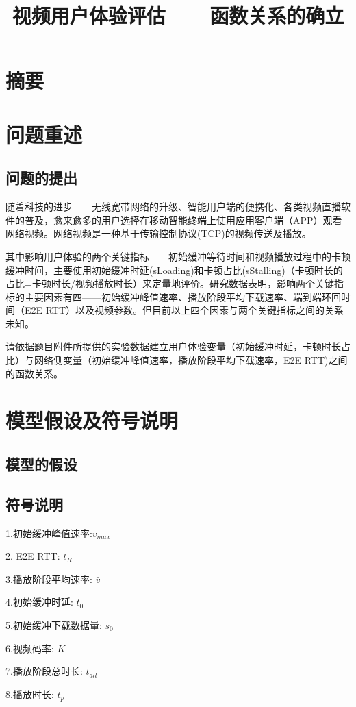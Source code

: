\documentclass[UTF8]{ctexart}
\title{视频用户体验评估——函数关系的确立}
\begin{document}
\maketitle
\section{摘要}
\section{问题重述}
\subsection{问题的提出}
随着科技的进步——无线宽带网络的升级、智能用户端的便携化、各类视频直播软件的普及，愈来愈多的用户选择在移动智能终端上使用应用客户端（APP）观看网络视频。网络视频是一种基于传输控制协议(TCP)的视频传送及播放。

其中影响用户体验的两个关键指标——初始缓冲等待时间和视频播放过程中的卡顿缓冲时间，主要使用初始缓冲时延(sLoading)和卡顿占比(sStalling)（卡顿时长的占比=卡顿时长/视频播放时长）来定量地评价。研究数据表明，影响两个关键指标的主要因素有四——初始缓冲峰值速率、播放阶段平均下载速率、端到端环回时间（E2E RTT）以及视频参数。但目前以上四个因素与两个关键指标之间的关系未知。

请依据题目附件所提供的实验数据建立用户体验变量（初始缓冲时延，卡顿时长占比）与网络侧变量（初始缓冲峰值速率，播放阶段平均下载速率，E2E RTT)之间的函数关系。
	
\section{模型假设及符号说明}
\subsection{模型的假设}
\subsection{符号说明}
1.初始缓冲峰值速率:$v_{max} $

2. E2E RTT: $t_{R}$

3.播放阶段平均速率: $ \bar{v} $

4.初始缓冲时延: $t_{0} $

5.初始缓冲下载数据量: $s_{0} $

6.视频码率: $K $

7.播放阶段总时长: $t_{all} $

8.播放时长: $t_{p} $
\end{document}
